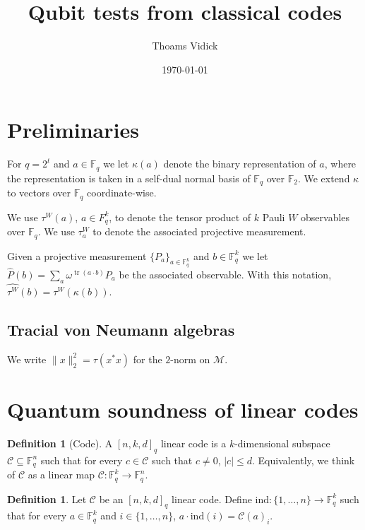 \documentclass[11pt]{article}
\theoremstyle{definition}
\newtheorem{definition}[theorem]{Definition}
\newcommand{\code}{\mathcal{C}}
\newcommand{\F}{\ensuremath{\mathbb{F}}}
\newcommand{\mM}{\ensuremath{\mathcal{M}}}
\newcommand{\ind}{\ensuremath{\mathrm{ind}}}
\DeclareMathOperator{\tr}{tr}
\begin{document}
\title{Qubit tests from classical codes}

\author{Thoams Vidick}
\date{\today}
\maketitle

\noteswarning


\begin{abstract}

\end{abstract}

	\section{Preliminaries}
	
	For $q=2^t$ and $a\in \F_q$ we let $\kappa(a)$ denote the binary representation of $a$, where the representation is taken in a self-dual normal basis of $\F_q$ over $\F_2$. We extend $\kappa$ to vectors over $\F_q$ coordinate-wise.
	
	We use $\tau^W(a)$, $a\in F_q^k$, to denote the tensor product of $k$ Pauli $W$ observables over $\F_q$. We use $\tau^W_a$ to denote the associated projective measurement. 
	
	Given a projective measurement $\{P_a\}_{a\in \F_q^k}$ and $b\in \F_q^k$ we let $\widehat{P}(b) = \sum_a \omega^{\tr(a\cdot b)} P_a$ be the associated observable. With this notation, $\widehat{\tau^W}(b)=\tau^W(\kappa(b))$.
	
	\subsection{Tracial von Neumann algebras}
	
	We write $\|x\|_2^2=\tau(x^*x)$ for the $2$-norm on $\mM$.
	
\section{Quantum soundness of linear codes}

\begin{definition}[Code]
A $[n,k,d]_q$ linear code is a $k$-dimensional subspace $\code\subseteq \F_q^n$ such that for every $c\in \code$ such that $c\neq 0$, $|c|\leq d$. Equivalently, we think of $\code$ as a linear map $\code:\F_q^k\to \F_q^n$. 
\end{definition}

\begin{definition}
Let $\code$ be an $[n,k,d]_q$ linear code. Define $\ind:\{1,\ldots,n\}\to \F_q^k$ such that for every $a\in \F_q^k$ and $i\in\{1,\ldots,n\}$, $a\cdot \ind(i) = \code(a)_i$.
\end{definition}
\end{document}

